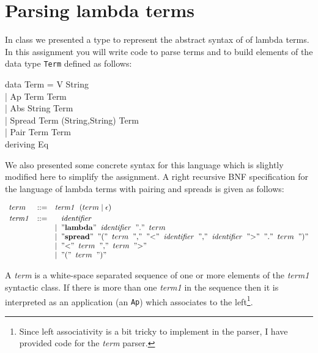 \documentclass[11pt]{article}
\newcommand{\quot}[1]{"{\tt{{#1}}}"}
\begin{document}

\section{Parsing lambda terms}

In class we presented a type to represent the abstract syntax of of lambda
terms.  In this assignment you will write code to parse terms and to build
elements of the data type {\tt{Term}} defined as follows:

\begin{program*}
\>  data Term = V String \\
\>            | Ap Term Term  \\
\>            | Abs String Term  \\
\>            | Spread Term (String,String) Term  \\
\>            | Pair Term Term \\
\>   deriving Eq \\
\end{program*}


\noindent{} We also presented some concrete syntax for this language which is
slightly modified here to simplify the assignment.  A right recursive BNF
specification for the language of lambda terms with pairing and spreads is
given as follows:

\[\begin{array}{lcl}
term & ::=  & {\mathit{term1}} \;\;(term \;| \;\epsilon) \vspace{.25em} \\
{\mathit{term1}} & ::= &  \;\;\; {\mathit{identifier}} \\
&& | \;\;  \quot{{\mathbf{lambda}}} \;\; {\mathit{identifier}} \;\; \quot{.} \;\; term \\
&& | \;\;  \quot{{\mathbf{spread}}} \;\; \quot{(} \;\; term \;\; \quot{,} \;\; \quot{<} \;\; {\mathit{identifier}} \;\; \quot{,} \;\; {\mathit{identifier}} \;\; \quot{>} \;\;\quot{.} \;\; term \;\; \quot{)} \\
&& | \;\;  \quot{<} \;\; term \;\; \quot{,} \;\; term \;\; \quot{>} \\
&& | \;\;  \quot{(} \;\; term \;\; \quot{)} \\
\end{array}
\]

\noindent{}A {\it{term}} is a white-space separated sequence of one or more
elements of the {\it{term1}} syntactic class.  If there is more than one
{\it{term1}} in the sequence then it is interpreted as an application (an
{\tt{Ap}}) which associates to the left\footnote{Since left associativity is a
bit tricky to implement in the parser, I have provided code for the {\it{term}}
parser.}.
\end{document}
